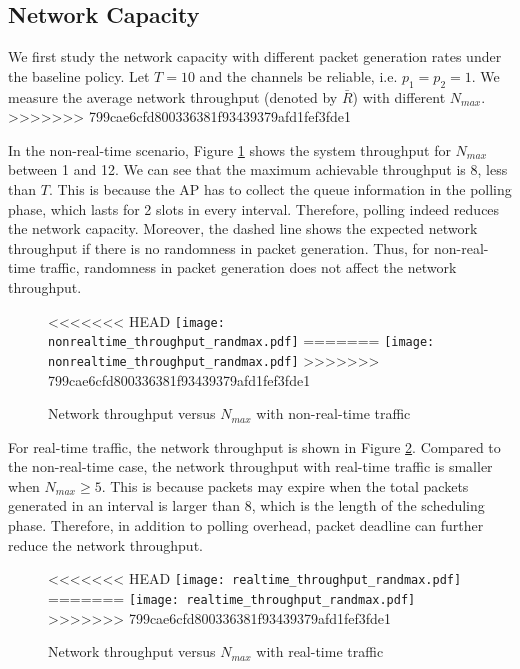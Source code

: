 \documentclass{article}
\begin{document}
\label{section: simulation}
\subsection{Network Capacity}
We first study the network capacity with different packet generation rates under the baseline policy. Let $T=10$ and the channels be reliable, i.e. $p_1 = p_2 = 1$. We measure the average network throughput (denoted by $\bar{R}$) with different $N_{max}$.
>>>>>>> 799cae6cfd800336381f93439379afd1fef3fde1

In the non-real-time scenario, Figure \ref{nonrealtime_throughput_randmax} shows the system throughput for $N_{max}$ between 1 and 12. We can see that the maximum achievable throughput is 8, less than $T$. This is because the AP has to collect the queue information in the polling phase, which lasts for 2 slots in every interval. Therefore, polling indeed reduces the network capacity. Moreover, the dashed line shows the expected network throughput if there is no randomness in packet generation. Thus, for non-real-time traffic, randomness in packet generation does not affect the network throughput.
\begin{figure}[htbp]
\centering
<<<<<<< HEAD
\texttt{[image: nonrealtime\_throughput\_randmax.pdf]}
=======
\texttt{[image: nonrealtime\_throughput\_randmax.pdf]}
>>>>>>> 799cae6cfd800336381f93439379afd1fef3fde1
\caption{Network throughput versus $N_{max}$ with non-real-time traffic}
\label{nonrealtime_throughput_randmax}
\end{figure}

For real-time traffic, the network throughput is shown in Figure \ref{realtime_throughput_randmax}. Compared to the non-real-time case, the network throughput with real-time traffic is smaller when $N_{max}\geq 5$. This is because packets may expire when the total packets generated in an interval is larger than 8, which is the length of the scheduling phase. Therefore, in addition to polling overhead, packet deadline can further reduce the network throughput. 

\begin{figure}[htbp]
\centering
<<<<<<< HEAD
\texttt{[image: realtime\_throughput\_randmax.pdf]}
=======
\texttt{[image: realtime\_throughput\_randmax.pdf]}
>>>>>>> 799cae6cfd800336381f93439379afd1fef3fde1
\caption{Network throughput versus $N_{max}$ with real-time traffic}
\label{realtime_throughput_randmax}
\end{figure}
\end{document}
